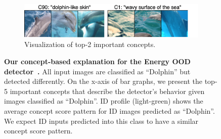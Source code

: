 \begin{figure}[t]
\begin{subfigure}[b]{\columnwidth}
         \hspace{1.5mm} \includegraphics[width=\textwidth]{figures/dolphin_concepts.png}
         \caption{\small Visualization of top-2 important concepts.}
     \end{subfigure}
     \caption{\small \textbf{Our concept-based explanation for the Energy OOD detector~\citep{liu2020energy}.} All input images are classified as ``Dolphin'' but detected differently. On the x-axis of bar graphs, we present the top-5 important concepts that describe the detector's behavior given images classified as ``Dolphin''.
    ID profile (light-green) shows the average concept score pattern for ID images predicted as ``Dolphin''. We expect ID inputs predicted into this class to have a similar concept score pattern.}
\vspace{-5mm}
\label{fig:expl-ours-dolphin}
\end{figure}

